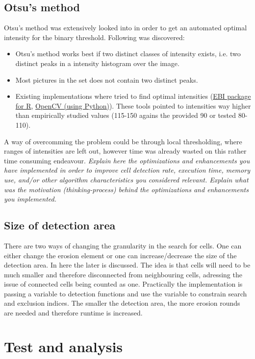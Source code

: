\documentclass[a4paper, english]{article}
\numberwithin{equation}{section}
\begin{document}
\subsection{Otsu's method}\label{sec:otsu}
Otsu's method was extensively looked into in order to get an automated optimal intensity for the binary threshold. Following was discovered:
\begin{itemize}
    \item Otsu's method works best if two distinct classes of intensity exists, i.e. two distinct peaks in a intensity histogram over the image.
    \item Most pictures in the set does not contain two distinct peaks.
    \item Existing implementations where tried to find optimal intensities (\href{https://rdrr.io/bioc/EBImage/}{EBI package for R}, \href{https://opencv.org/}{OpenCV (using Python)}). These tools pointed to intensities way higher than empirically studied values (115-150 agains the provided 90 or tested 80-110).
\end{itemize}
A way of overcomming the problem could be through local thresholding, where ranges of intensities are left out, however time was already wasted on this rather time consuming endeavour.\newline
\textit{Explain here the optimizations and enhancements you have implemented in order to improve cell detection rate, execution time, memory use, and/or other algorithm characteristics you considered relevant. Explain what was the motivation (thinking-process) behind the optimizations and enhancements you implemented.}
\subsection{Size of detection area}\label{sec:detect}
There are two ways of changing the granularity in the search for cells. One can either change the erosion element or one can increase/decrease the size of the detection area. In here the later is discussed. The idea is that cells will need to be much smaller and therefore disconnected from neighbouring cells, adressing the issue of connected cells being counted as one. Practically the implementation is passing a variable to detection functions and use the variable to constrain search and exclusion indices. The smaller the detection area, the more erosion rounds are needed and therefore runtime is increased.
\section{Test and analysis}
\end{document}
